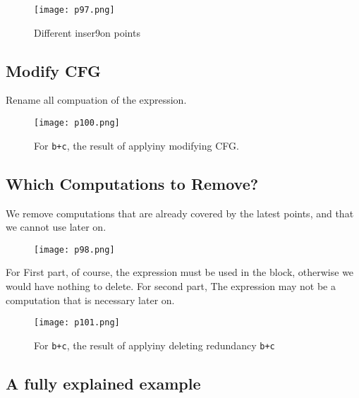 \begin{figure}[H]
    \centering
     \texttt{[image: p97.png]}
         \caption{	Different	inser9on	points}
         \label{fig:p97}
\end{figure}
\subsection{Modify CFG}

Rename all compuation of the expression.  

\begin{figure}[H]
    \centering
     \texttt{[image: p100.png]}
         \caption{For \texttt{b+c}, the result of applyiny modifying CFG.}
         \label{fig:p100}
\end{figure}


\subsection{Which	Computations	to	Remove?	}
We	remove	computations	that	are	already	covered	by	
the	latest	points,	and	that	we	cannot	use	later	on.	

\begin{figure}[H]
    \centering
     \texttt{[image: p98.png]}
         
         \label{fig:p98}
\end{figure}




For {\color{red} First} part, of	course,	the	expression	
must	be	used	in	the	block,	
otherwise	we	would	have	
nothing	to	delete. For {\color{blue} second} part, The	expression	may	not	be	a	
computation	that	is	necessary	
later	on.	


\begin{figure}[H]
    \centering
     \texttt{[image: p101.png]}
         \caption{For \texttt{b+c}, the result of applyiny deleting redundancy \texttt{b+c}}
         \label{fig:p100}
\end{figure}



\subsection{A fully explained example}






